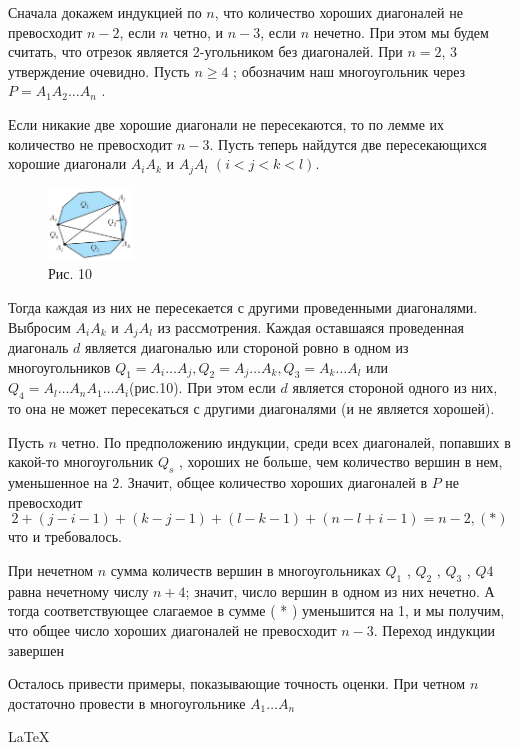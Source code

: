 \begin{multicols}{2}
Сначала докажем индукцией по $n$, что количество хороших
диагоналей не превосходит $n - 2$, если $n$ четно, и $n - 3$, если $n$ нечетно. При этом мы будем считать, что отрезок является 2-угольником без диагоналей. При $n=2$, 3 утверждение очевидно. Пусть $n \geq 4$ ; обозначим наш многоугольник через $P=A_1A_2{\ldots}A_n$ .

Если никакие две хорошие диагонали не пересекаются, то по
лемме их количество не превосходит $n - 3$. Пусть теперь найдутся две пересекающихся хорошие диагонали $A_iA_k$ и $A_jA_l$ $(i<j<k<l)$.
\begin{figure}
\includegraphics[width=0.2\textwidth]{img.jpg}\\
Рис. 10
\end{figure}
Тогда каждая из них не пересекается с другими
проведенными диагоналями. Выбросим $A_iA_k$ и $A_jA_l$ из рассмотрения. Каждая оставшаяся проведенная диагональ $d$ является диагональю или стороной ровно в одном из многоугольников $Q_1=A_i{\ldots}A_j , Q_2 = A_j{\ldots}A_k , Q_3 = A_k{\ldots}A_l$ или $Q_4 = A_l{\ldots}A_nA_1{\ldots}A_i$(рис.10). При этом если $d$ является стороной одного из них, то она не может пересекаться с другими диагоналями (и не является хорошей).

Пусть $n$ четно. По предположению индукции, среди всех диагоналей, попавших в какой-то многоугольник $Q_s$
, хороших не больше, чем количество вершин в нем, уменьшенное на $2$.
Значит, общее количество хороших диагоналей в $P$ не превосходит
\[ 2+(j-i-1)+(k-j-1)+(l-k-1)+(n-l+i-1)=n-2 , ( * )\]
что и требовалось.

При нечетном $n$ сумма количеств вершин в многоугольниках $Q_1$ , $Q_2$ , $Q_3$ , $Q4$ равна нечетному числу $n + 4$; значит, число вершин в одном из них нечетно. А тогда соответствующее
слагаемое в сумме ( * ) уменьшится на 1, и мы получим, что
общее число хороших диагоналей не превосходит $n - 3$. Переход индукции завершен

Осталось привести примеры, показывающие точность оценки.
При четном $n$ достаточно провести в многоугольнике $A_1{\ldots}A_n$
\end{multicols}
\clearpage
\LaTeX